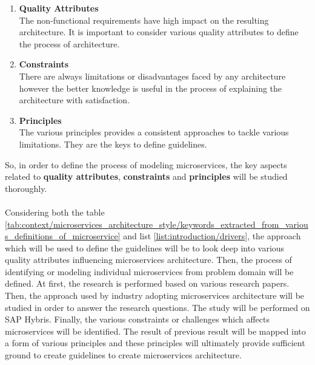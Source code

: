 \begin{enumerate}
\item \textbf{Quality Attributes}\\
The non-functional requirements have high impact on the resulting architecture. It is important to consider various quality attributes to define the process of architecture.
\item \textbf{Constraints}\\
There are always limitations or disadvantages faced by any architecture however the better knowledge is useful in the process of explaining the architecture with satisfaction.
\item \textbf{Principles}\\
The various principles provides a consistent approaches to tackle various limitations. They are the keys to define guidelines.
\end{enumerate}
So, in order to define the process of modeling microservices, the key aspects related to \textbf{quality attributes}, \textbf{constraints} and \textbf{principles} will be studied thoroughly.
\\
\\
Considering both the table \ref{tab:context/microservices_architecture_style/keywords_extracted_from_various_definitions_of_microservice} and list \ref{list:introduction/drivers}, the approach which will be used to define the guidelines will be to look deep into various quality attributes influencing microservices architecture. Then, the process of identifying or modeling individual microservices from problem domain will be defined. At first, the research is performed based on various research papers. Then, the approach used by industry adopting microservices architecture will be studied in order to answer the research questions. The study will be performed on SAP Hybris.
Finally, the various constraints or challenges which affects microservices will be identified. 
The result of previous result will be mapped into a form of various principles and these principles will ultimately provide sufficient ground to create guidelines to create microservices architecture.



